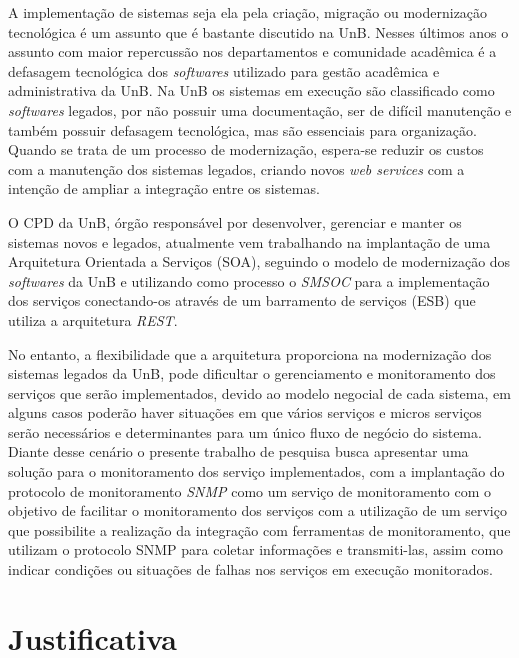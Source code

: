 \label{Introducao}

A implementação de sistemas seja ela pela criação, migração ou modernização tecnológica é um assunto que é bastante discutido na \acrfull{UnB}. Nesses últimos anos o assunto com maior repercussão nos departamentos e comunidade acadêmica é a defasagem tecnológica dos \textit{softwares} utilizado para gestão acadêmica e administrativa da \acrshort{UnB}. Na \acrshort{UnB} os sistemas em execução são classificado como \textit{softwares} legados, por não possuir uma documentação, ser de difícil manutenção e também possuir defasagem tecnológica, mas são essenciais para organização. Quando se trata de um processo de modernização, espera-se reduzir os custos com a manutenção dos sistemas legados, criando novos \textit{web services} com a intenção de ampliar a integração entre os sistemas\cite{Agilar}.

O \acrfull{CPD} da \acrshort{UnB}, órgão responsável por desenvolver, gerenciar e manter os sistemas novos e legados, atualmente vem trabalhando na implantação de uma Arquitetura Orientada a Serviços (\acrshort{SOA}), seguindo o modelo de modernização dos \textit{softwares} da \acrshort{UnB} e utilizando como processo o \textit{\acrfull{SMSOC}} para a implementação dos serviços conectando-os  através de um barramento de serviços (\acrshort{ESB}) que utiliza a arquitetura \textit{\acrfull{REST}}.

No entanto, a flexibilidade que a arquitetura proporciona na modernização dos sistemas legados da \acrshort{UnB}, pode dificultar o gerenciamento e monitoramento dos serviços que serão implementados, devido ao modelo negocial de cada sistema, em alguns casos poderão haver situações em que vários serviços e micros serviços serão necessários e determinantes para um único fluxo de negócio do sistema. Diante desse cenário o presente trabalho de pesquisa busca apresentar uma solução para o monitoramento dos serviço implementados, com a implantação do protocolo de monitoramento \textit{\acrfull{SNMP}} como um serviço de monitoramento com o objetivo de facilitar o monitoramento dos serviços com a utilização de um serviço que possibilite a realização da integração com ferramentas de monitoramento, que utilizam o protocolo \acrshort{SNMP} para coletar informações e transmiti-las, assim como indicar condições ou situações de falhas nos serviços em execução monitorados.


\section{Justificativa}


